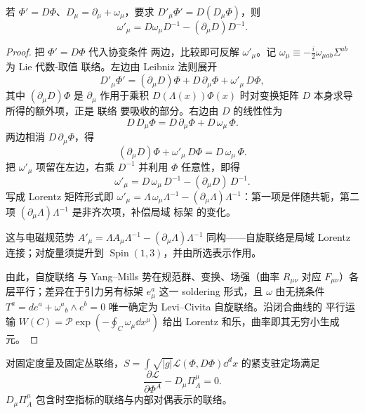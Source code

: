 \begin{proposition}[局域标架变换的联络律]
若 $\Phi'=D\Phi$、$D_\mu=\partial_\mu+\omega_\mu$，要求 $D'_\mu\Phi'=D(D_\mu\Phi)$，则\[\omega'_\mu=D\omega_\mu D^{-1}-(\partial_\mu D)D^{-1}.\]
\end{proposition}

\begin{proof}
把 $\Phi'=D\Phi$ 代入协变条件 两边，比较即可反解 $\omega'_\mu$。记 $\omega_\mu\equiv-\frac{i}{2}\omega_{\mu ab}\Sigma^{ab}$ 为 Lie 代数-取值 联络。左边由 Leibniz 法则展开
\begin{equation*}
D'_\mu\Phi'=(\partial_\mu D)\Phi+D\,\partial_\mu\Phi+\omega'_\mu\,D\Phi,
\end{equation*}
其中 $(\partial_\mu D)\Phi$ 是 $\partial_\mu$ 作用于乘积 $D(\Lambda(x))\Phi(x)$ 时对变换矩阵 $D$ 本身求导所得的额外项，正是 联络 要吸收的部分。右边由 $D$ 的线性性为
\begin{equation*}
D\,D_\mu\Phi=D\,\partial_\mu\Phi+D\,\omega_\mu\,\Phi.
\end{equation*}
两边相消 $D\,\partial_\mu\Phi$，得
\begin{equation*}
(\partial_\mu D)\Phi+\omega'_\mu\,D\Phi=D\,\omega_\mu\,\Phi.
\end{equation*}
把 $\omega'_\mu$ 项留在左边，右乘 $D^{-1}$ 并利用 $\Phi$ 任意性，即得
\begin{equation}\label{eq:ms-curved-omega-transform}
\boxed{
\omega'_\mu=D\,\omega_\mu\,D^{-1}-(\partial_\mu D)\,D^{-1}.
}
\end{equation}
写成 Lorentz 矩阵形式即 $\omega'_\mu=\Lambda\,\omega_\mu\Lambda^{-1}-(\partial_\mu\Lambda)\Lambda^{-1}$：第一项是伴随共轭，第二项 $(\partial_\mu\Lambda)\Lambda^{-1}$ 是非齐次项，补偿局域 标架 的变化。

这与电磁规范势 $A'_\mu=\Lambda A_\mu\Lambda^{-1}-(\partial_\mu\Lambda)\Lambda^{-1}$ 同构——自旋联络是局域 Lorentz 连接；对旋量须提升到 $\operatorname{Spin}(1,3)$，并由所选表示作用。

由此，自旋联络 与 Yang--Mills 势在规范群、变换、场强（曲率 $R_{\mu\nu}$ 对应 $F_{\mu\nu}$）各层平行；差异在于引力另有标架 $e_\mu^a$ 这一 soldering 形式，且 $\omega$ 由无挠条件 $T^a=de^a+\omega^a{}_b\wedge e^b=0$ 唯一确定为 Levi--Civita 自旋联络。沿闭合曲线的 平行运输 $W(C)=\mathcal P\exp(-\oint_C\omega_\mu\dd x^\mu)$ 给出 Lorentz 和乐，曲率即其无穷小生成元。
\end{proof}

\begin{proposition}
对固定度量及固定丛联络，$S=\int\sqrt{|g|}\mathcal L(\Phi,D\Phi)\dd^dx$ 的紧支驻定场满足\[\frac{\partial\mathcal L}{\partial\Phi^A}-D_\mu\Pi_A^\mu=0.\]$D_\mu\Pi_A^\mu$ 包含时空指标的联络与内部对偶表示的联络。
\end{proposition}

